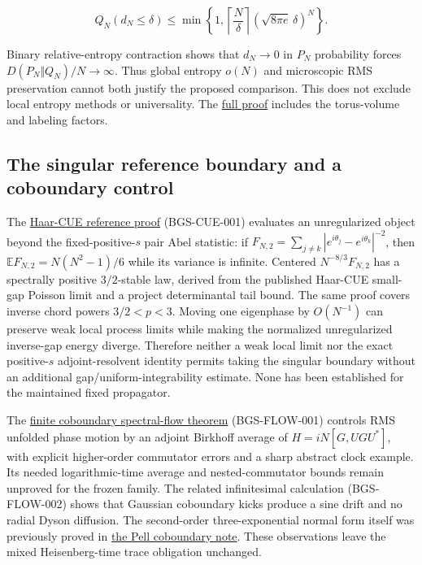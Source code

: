 \[
Q_N(d_N\le\delta)\le
 \min\left\{1,\left\lceil\frac N\delta\right\rceil
                   (\sqrt{8\pi e}\,\delta)^N\right\}.
\]

Binary relative-entropy contraction shows that \(d_N\to0\) in \(P_N\)
probability forces \(D(P_N\Vert Q_N)/N\to\infty\). Thus global entropy
\(o(N)\) and microscopic RMS preservation cannot both justify the proposed
comparison. This does not exclude local entropy methods or universality.
The \href{https://github.com/ChurilovMaksim/BGS/blob/main/supplement/fixed_map/resolvent-flow/entropy_obstruction.md}{full proof}
includes the torus-volume and labeling factors.

\hypertarget{the-singular-reference-boundary-and-a-coboundary-control}{%
\subsection{The singular reference boundary and a coboundary control}\label{the-singular-reference-boundary-and-a-coboundary-control}}

The \href{https://github.com/ChurilovMaksim/BGS/blob/main/mathematics/cue_singular_energy.md}{Haar-CUE reference proof} (BGS-CUE-001)
evaluates an unregularized object beyond the fixed-positive-\(s\)
pair Abel statistic: if \(F_{N,2}=\sum_{j\ne k} |e^{i\theta_j}-e^{i\theta_k}|^{-2}\), then
\(\mathbb EF_{N,2}=N(N^2-1)/6\) while its variance
is infinite. Centered \(N^{-8/3}F_{N,2}\) has a
spectrally positive \(3/2\)-stable law, derived from the
published Haar-CUE small-gap Poisson limit and a
project determinantal tail bound. The same proof covers
inverse chord powers \(3/2<p<3\).
Moving one eigenphase by \(O(N^{-1})\) can preserve
weak local process limits while making the normalized
unregularized inverse-gap energy diverge. Therefore
neither a weak local limit nor the exact positive-\(s\)
adjoint-resolvent identity permits taking the singular
boundary without an additional gap/uniform-integrability
estimate. None has been established for the maintained
fixed propagator.

The \href{https://github.com/ChurilovMaksim/BGS/blob/main/mathematics/coboundary_spectral_flow_bound.md}{finite coboundary spectral-flow theorem}
(BGS-FLOW-001) controls RMS unfolded phase motion by an
adjoint Birkhoff average of \(H=iN[G,UGU^*]\), with
explicit higher-order commutator errors and a sharp
abstract clock example. Its needed logarithmic-time
average and nested-commutator bounds remain unproved
for the frozen family. The related infinitesimal
calculation (BGS-FLOW-002) shows that Gaussian
coboundary kicks produce a sine drift and no radial
Dyson diffusion. The second-order three-exponential
normal form itself was previously proved in
\href{https://github.com/ChurilovMaksim/BGS/blob/main/mathematics/pell/pell_coboundary_resonance.md}{the Pell coboundary note}.
These observations leave the mixed Heisenberg-time
trace obligation unchanged.

